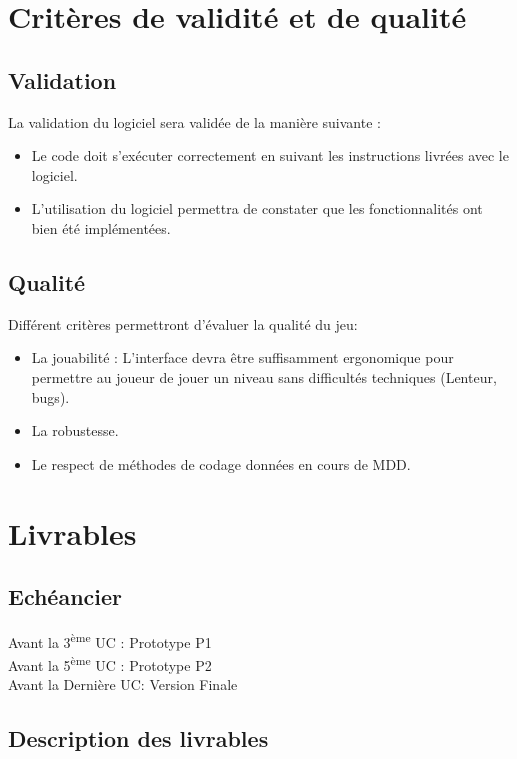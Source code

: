 \documentclass[a4paper,11pt]{scrartcl}
\begin{document}
\section{Critères de validité et de qualité}

\subsection{Validation}


La validation du logiciel sera validée de la manière suivante :\\
\begin{itemize}[label = $\bullet$]
	\item Le code doit s’exécuter correctement en suivant les instructions livrées avec le logiciel.
	\item L'utilisation du logiciel permettra de constater que les fonctionnalités ont bien été implémentées.
\end{itemize}

\subsection{Qualité}


Différent critères permettront d'évaluer la qualité du jeu:\\
\begin{itemize}[label = $\bullet$]
	\item La jouabilité : L'interface devra être suffisamment ergonomique pour permettre au joueur de jouer un niveau sans difficultés techniques (Lenteur, bugs).
	\item La robustesse.
	\item Le respect de méthodes de codage données en cours de MDD.
\end{itemize}

\section{Livrables}

\subsection{Echéancier}

\noindent
Avant la 3\textsuperscript{ème} UC : Prototype P1 \\
Avant la 5\textsuperscript{ème} UC : Prototype P2 \\
Avant la Dernière UC: Version Finale
\subsection{Description des livrables}
\end{document}
